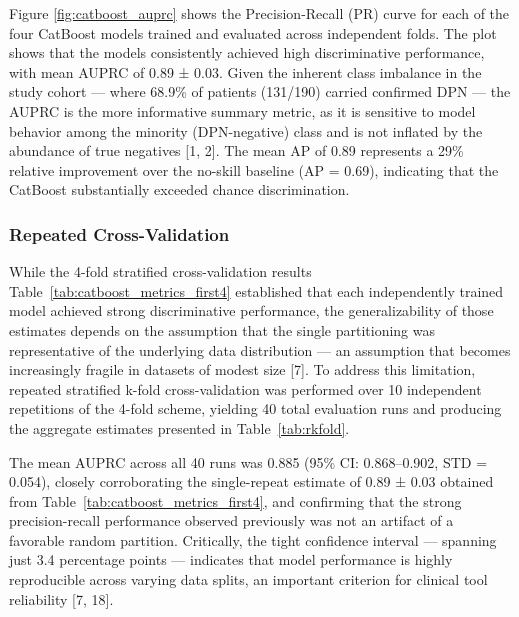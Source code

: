 \documentclass[pdflatex,sn-vancouver-num]{sn-jnl}
\begin{document}
Figure \ref{fig:catboost_auprc} shows the Precision-Recall (PR) curve for each of the four CatBoost models trained and evaluated across independent folds. The plot shows that the models consistently achieved high discriminative performance, with mean AUPRC of 0.89 ± 0.03. Given the inherent class imbalance in the study cohort — where 68.9\% of patients (131/190) carried confirmed DPN — the AUPRC is the more informative summary metric, as it is sensitive to model behavior among the minority (DPN-negative) class and is not inflated by the abundance of true negatives [1, 2]. The mean AP of 0.89 represents a 29\% relative improvement over the no-skill baseline (AP = 0.69), indicating that the CatBoost substantially exceeded chance discrimination.

\subsubsection{Repeated Cross-Validation}
While the 4-fold stratified cross-validation results Table~\ref{tab:catboost_metrics_first4} established that each independently trained model achieved strong discriminative performance, the generalizability of those estimates depends on the assumption that the single partitioning was representative of the underlying data distribution — an assumption that becomes increasingly fragile in datasets of modest size [7]. To address this limitation, repeated stratified k-fold cross-validation was performed over 10 independent repetitions of the 4-fold scheme, yielding 40 total evaluation runs and producing the aggregate estimates presented in Table~\ref{tab:rkfold}.

The mean AUPRC across all 40 runs was 0.885 (95\% CI: 0.868–0.902, STD = 0.054), closely corroborating the single-repeat estimate of 0.89 ± 0.03 obtained from Table~\ref{tab:catboost_metrics_first4}, and confirming that the strong precision-recall performance observed previously was not an artifact of a favorable random partition. Critically, the tight confidence interval — spanning just 3.4 percentage points — indicates that model performance is highly reproducible across varying data splits, an important criterion for clinical tool reliability [7, 18]. 
\end{document}
